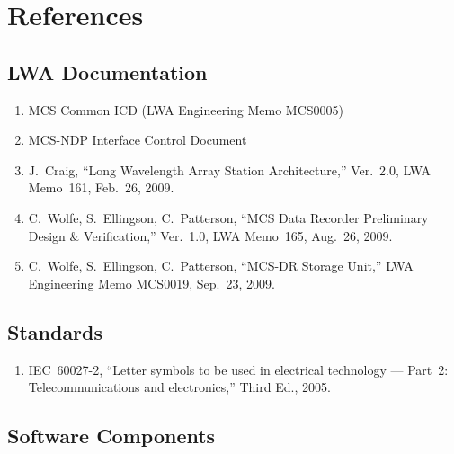 
\chapter{References}
\label{sec:references}

\section{LWA Documentation}

\begin{enumerate}
    \item MCS Common ICD (LWA Engineering Memo MCS0005)
    \item MCS-NDP Interface Control Document
    \item J.~Craig, ``Long Wavelength Array Station Architecture,'' Ver.~2.0, LWA Memo~161, Feb.~26, 2009.
    \item C.~Wolfe, S.~Ellingson, C.~Patterson, ``MCS Data Recorder Preliminary Design \& Verification,'' Ver.~1.0, LWA Memo~165, Aug.~26, 2009.
    \item C.~Wolfe, S.~Ellingson, C.~Patterson, ``MCS-DR Storage Unit,'' LWA Engineering Memo MCS0019, Sep.~23, 2009.
\end{enumerate}

\section{Standards}

\begin{enumerate}
    \item IEC~60027-2, ``Letter symbols to be used in electrical technology --- Part~2: Telecommunications and electronics,'' Third Ed., 2005.
\end{enumerate}

\section*{Software Components}

